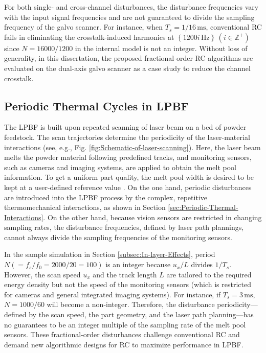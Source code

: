 \documentclass [11pt, proquest] {uwthesis}[2020/02/24]
\begin{document}
For both single- and cross-channel disturbances, the disturbance frequencies
vary with the input signal frequencies and are not guaranteed to divide
the sampling frequency of the galvo scanner. For instance, when $T_{s}=1/16\,\text{ms}$,
conventional RC fails in eliminating the crosstalk-induced harmonics
at $\left\{ 1200i\,\text{Hz}\right\} \,(i\in\mathbb{Z}^{+})$ since
$N=16000/1200$ in the internal model is not an integer. Without loss
of generality, in this dissertation, the proposed fractional-order RC algorithms
are evaluated on the dual-axis galvo scanner as a case study to reduce
the channel crosstalk.

\subsection{Periodic Thermal Cycles in LPBF} \label{subec:Periodic-thermal-cycles}

The LPBF is built upon repeated scanning of laser beam on a bed of
powder feedstock. The scan trajectories determine the periodicity
of the laser-material interactions (see, e.g., Fig. \ref{fig:Schematic-of-laser-scanning}).
Here, the laser beam melts the powder material following predefined
tracks, and monitoring sensors, such as cameras and imaging systems,
are applied to obtain the melt pool information. To get a uniform
part quality, the melt pool width is desired to be kept at a user-defined
reference value \cite{hofman2012camera}. On the one hand, periodic
disturbances are introduced into the LPBF process by the complex, repetitive
thermomechanical interactions, as shown in Section \ref{sec:Periodic-Thermal-Interactions}. On the other hand, because vision sensors
are restricted in changing sampling rates, the disturbance frequencies,
defined by laser path plannings, cannot always divide the sampling
frequencies of the monitoring sensors.

In the sample simulation in Section \ref{subsec:In-layer-Effects}, period $N(=f_{s}/f_{0}=2000/20=100)$ is an integer
because $u_x/L$ divides $1/T_{s}$. However, the scan speed $u_x$ and
the track length $L$ are tailored to the required energy density
but not the speed of the monitoring sensors (which is restricted for
cameras and general integrated imaging systems). For instance, if
$T_{s}=3\,\text{ms}$, $N=1000/60$ will become a non-integer. Therefore,
the disturbance periodicity---defined by the scan speed, the part geometry,
and the laser path planning---has no guarantees to be an integer multiple
of the sampling rate of the melt pool sensors. These fractional-order disturbances challenge conventional RC and
demand new algorithmic designs for RC to maximize performance in LPBF.
\end{document}
